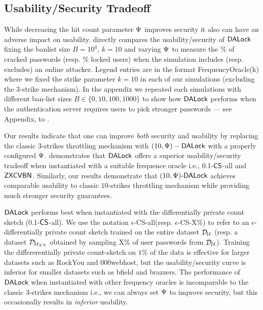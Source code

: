 \subsection{Usability/Security Tradeoff}

\label{section:ExperimentResult-security}
While decreasing the hit count parameter $\Psi$ improves security it also can have an adverse impact on usability.   
 directly compares the usability/security of $\mathsf{DALock}$ fixing the banlist size $B=10^4$, $k=10$ and varying $\Psi$ to measure the $\%$ of cracked passwords (resp. $\%$ locked users) when the simulation includes (resp. excludes) an online attacker.  Legend entries are in the format FrequencyOracle(k) where we fixed the strike parameter $k=10$ in each of our simulations (excluding the 3-strike mechanism). In the appendix we repeated  each simulations with different ban-list sizes $B \in \{0,  10, 100, 1000\}$ to show how $\mathsf{DALock}$ performs when the authentication server requires users to pick stronger passwords --- see Appendix,   to .


Our results indicate that one can improve {\em both} security and usability by replacing the classic 3-strikes throttling mechanism with $(10,\Psi)-\mathsf{DALock}$ with a properly configured $\Psi$.  demonstrates that $\mathsf{DALock}$ offers a superior usability/security tradeoff when instantiated with a suitable frequence oracle i.e., 0.1-$\mathsf{CS}$-all and $\mathsf{ZXCVBN}$. Similarly, our results demonstrate that $(10, \Psi)\text{-}\mathsf{DALock}$  achieves comparable usability to classic $10$-strikes throttling mechanism while providing much stronger security guarantees. 

$\mathsf{DALock}$ performs best when instantiated with the differentially private count sketch (0.1-$\mathsf{CS}$-all). We use the notation $\epsilon$-CS-all(resp. $\epsilon$-CS-X\%) to refer to an $\epsilon$-differentially private count sketch trained on the entire dataset $\mathcal{D}_{{\mathcal{U}}}$ (resp. a dataset $\mathcal{D}_{{\mathcal{U}_{X\%}}}$ obtained by sampling X\% of user passwords from $\mathcal{D}_{{\mathcal{U}}}$). Training the differerentially private count-sketch on $1\%$ of the data is effective for larger datasets such as RockYou and 000webhost, but the usability/security curve is inferior for smaller datasets such as bfield and brazzers. The performance of $\mathsf{DALock}$ when instantiated with other frequency oracles is incomparable to the classic $3$-strikes mechanism i.e., we can always set $\Psi$ to improve security, but this occasionally results in {\em inferior} usability. 




